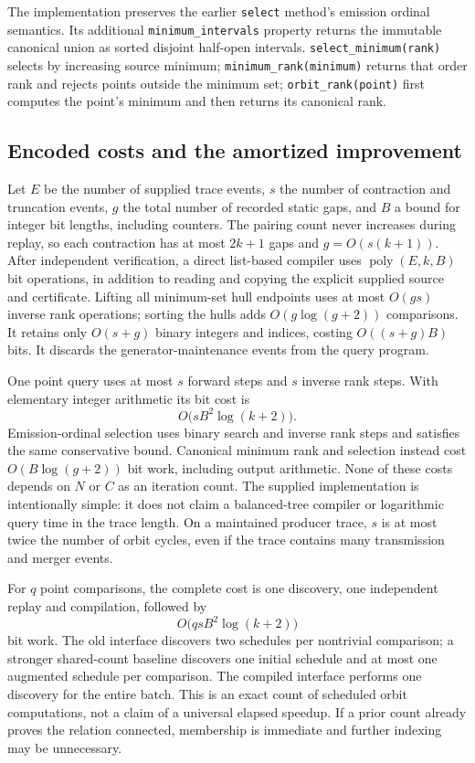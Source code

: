 The implementation preserves the earlier \texttt{select} method's emission
ordinal semantics.  Its additional \texttt{minimum\_intervals} property
returns the immutable canonical union as sorted disjoint half-open intervals.
\texttt{select\_minimum(rank)} selects by increasing source minimum;
\texttt{minimum\_rank(minimum)} returns that order rank and rejects points
outside the minimum set; \texttt{orbit\_rank(point)} first computes the
point's minimum and then returns its canonical rank.

\subsection{Encoded costs and the amortized improvement}

Let $E$ be the number of supplied trace events, $s$ the number of contraction
and truncation events, $g$ the total number of recorded static gaps, and $B$
a bound for integer bit lengths, including counters.  The pairing count
never increases during replay, so each contraction has at most $2k+1$ gaps
and $g=O(s(k+1))$. After independent verification, a direct list-based compiler
uses $\operatorname{poly}(E,k,B)$ bit operations, in addition to reading and
copying the explicit supplied source and certificate.  Lifting all
minimum-set hull endpoints uses at most $O(gs)$ inverse rank operations;
sorting the hulls adds $O(g\log(g+2))$ comparisons.  It retains only
$O(s+g)$ binary integers and indices, costing $O((s+g)B)$ bits.  It discards
the generator-maintenance events from the query program.

One point query uses at most $s$ forward steps and $s$ inverse rank steps.
With elementary integer arithmetic its bit cost is
\[
 O\bigl(s B^2\log(k+2)\bigr).
\]
Emission-ordinal selection uses binary search and inverse rank steps and
satisfies the same conservative bound.  Canonical minimum rank and selection
instead cost $O(B\log(g+2))$ bit work, including output arithmetic.
None of these costs depends on $N$ or $C$ as an
iteration count.  The supplied implementation is intentionally simple:
it does not claim a balanced-tree compiler or logarithmic query time in
the trace length.  On a maintained producer trace, $s$ is at most twice
the number of orbit cycles, even if the trace contains many transmission
and merger events.

For $q$ point comparisons, the complete cost is one discovery, one
independent replay and compilation, followed by
\[
 O\bigl(qs B^2\log(k+2)\bigr)
\]
bit work.  The old interface discovers two schedules per nontrivial
comparison; a stronger shared-count baseline discovers one initial schedule
and at most one augmented schedule per comparison.  The compiled interface
performs one discovery for the entire batch.  This is an exact count of
scheduled orbit computations, not a claim of a universal elapsed speedup.
If a prior count already proves the relation connected, membership is
immediate and further indexing may be unnecessary.

